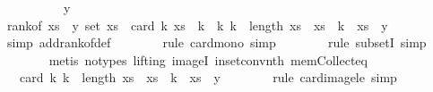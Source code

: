 \begin{isabellebody}
\ \ \isamarkupfalse%
\ {\isacharminus}{\kern0pt}\isanewline
\ \ \ \ \isamarkupfalse%
\ y\isanewline
\ \ \ \ \isamarkupfalse%
\ {\isachardoublequoteopen}rank{\isacharunderscore}{\kern0pt}of\ {\isacharparenleft}{\kern0pt}xs\ {\isacharbang}{\kern0pt}\ y{\isacharparenright}{\kern0pt}\ {\isacharparenleft}{\kern0pt}set\ xs{\isacharparenright}{\kern0pt}\ {\isasymle}\ card\ {\isacharparenleft}{\kern0pt}{\isacharparenleft}{\kern0pt}{\isasymlambda}k{\isachardot}{\kern0pt}\ xs\ {\isacharbang}{\kern0pt}\ k{\isacharparenright}{\kern0pt}\ {\isacharbackquote}{\kern0pt}\ {\isacharbraceleft}{\kern0pt}k{\isachardot}{\kern0pt}\ k\ {\isacharless}{\kern0pt}\ length\ xs\ {\isasymand}\ xs\ {\isacharbang}{\kern0pt}\ k\ {\isacharless}{\kern0pt}\ xs\ {\isacharbang}{\kern0pt}\ y{\isacharbraceright}{\kern0pt}{\isacharparenright}{\kern0pt}{\isachardoublequoteclose}\isanewline
\ \ \ \ \ \ \isamarkupfalse%
\ {\isacharparenleft}{\kern0pt}simp\ add{\isacharcolon}{\kern0pt}rank{\isacharunderscore}{\kern0pt}of{\isacharunderscore}{\kern0pt}def{\isacharparenright}{\kern0pt}\isanewline
\ \ \ \ \ \ \isamarkupfalse%
\ {\isacharparenleft}{\kern0pt}rule\ card{\isacharunderscore}{\kern0pt}mono{\isacharcomma}{\kern0pt}\ simp{\isacharparenright}{\kern0pt}\isanewline
\ \ \ \ \ \ \isamarkupfalse%
\ {\isacharparenleft}{\kern0pt}rule\ subsetI{\isacharcomma}{\kern0pt}\ simp{\isacharparenright}{\kern0pt}\isanewline
\ \ \ \ \ \ \isamarkupfalse%
\ {\isacharparenleft}{\kern0pt}metis\ {\isacharparenleft}{\kern0pt}no{\isacharunderscore}{\kern0pt}types{\isacharcomma}{\kern0pt}\ lifting{\isacharparenright}{\kern0pt}\ imageI\ in{\isacharunderscore}{\kern0pt}set{\isacharunderscore}{\kern0pt}conv{\isacharunderscore}{\kern0pt}nth\ mem{\isacharunderscore}{\kern0pt}Collect{\isacharunderscore}{\kern0pt}eq{\isacharparenright}{\kern0pt}\isanewline
\ \ \ \ \isamarkupfalse%
\ \isamarkupfalse%
\ {\isachardoublequoteopen}{\isachardot}{\kern0pt}{\isachardot}{\kern0pt}{\isachardot}{\kern0pt}\ {\isasymle}\ card\ {\isacharbraceleft}{\kern0pt}k{\isachardot}{\kern0pt}\ k\ {\isacharless}{\kern0pt}\ length\ xs\ {\isasymand}\ xs\ {\isacharbang}{\kern0pt}\ k\ {\isacharless}{\kern0pt}\ xs\ {\isacharbang}{\kern0pt}\ y{\isacharbraceright}{\kern0pt}{\isachardoublequoteclose}\isanewline
\ \ \ \ \ \ \isamarkupfalse%
\ {\isacharparenleft}{\kern0pt}rule\ card{\isacharunderscore}{\kern0pt}image{\isacharunderscore}{\kern0pt}le{\isacharcomma}{\kern0pt}\ simp{\isacharparenright}{\kern0pt}\isanewline

\end{isabellebody}
